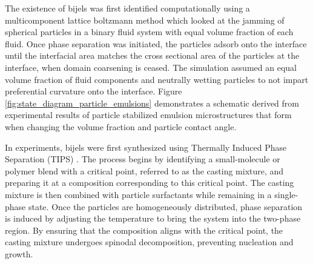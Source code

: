 The existence of bijels was first identified computationally using a multicomponent lattice boltzmann method which looked at 
the jamming of spherical particles in a binary fluid system with equal volume fraction of each fluid. 
\cite{stratford_colloidal_2005} Once phase separation was initiated, the particles adsorb onto the interface until the interfacial
area matches the cross sectional area of the particles at the interface, when domain coarsening is ceased. The simulation assumed
an equal volume fraction of fluid components and neutrally wetting particles to not impart preferential curvature onto the interface.
Figure \ref{fig:state_diagram_particle_emulsions} demonstrates a schematic derived from experimental results of particle stabilized
emulsion microstructures that form when changing the volume fraction and particle contact angle.

In experiments, bijels were first synthesized using Thermally Induced Phase Separation (TIPS) \cite{herzig_bicontinuous_2007, lee_bicontinuous_2010, bai_dynamics_2015}. 
The process begins by identifying a small-molecule or polymer blend with a critical point, referred to as the casting mixture, and preparing it at a composition 
corresponding to this critical point. The casting mixture is then combined with particle surfactants while remaining in a single-phase state. Once the particles 
are homogeneously distributed, phase separation is induced by adjusting the temperature to bring the system into the two-phase region. By ensuring that the 
composition aligns with the critical point, the casting mixture undergoes spinodal decomposition, preventing nucleation and growth. 

